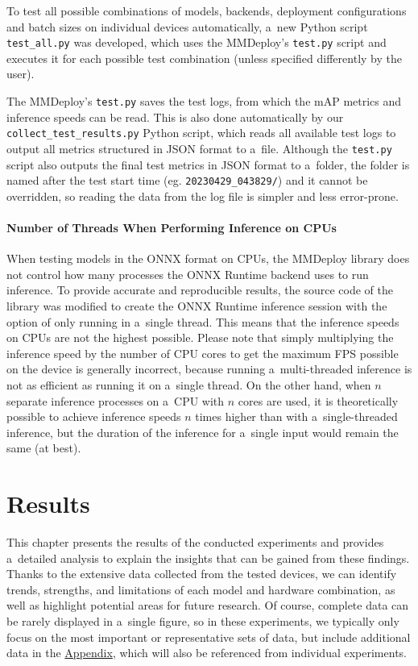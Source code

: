 To test all possible combinations of models, backends, deployment configurations
and batch sizes on individual devices automatically, a~new Python script
\texttt{test\_all.py} was developed, which uses the MMDeploy's \texttt{test.py}
script and executes it for each possible test combination (unless specified
differently by the user).

The MMDeploy's \texttt{test.py} saves the test logs, from which the mAP metrics
and inference speeds can be read. This is also done automatically by our
\texttt{collect\_test\_results.py} Python script, which reads all available test
logs to output all metrics structured in JSON format to a~file. Although the
\texttt{test.py} script also outputs the final test metrics in JSON format to
a~folder, the folder is named after the test start time (eg.
\texttt{20230429\_043829/}) and it cannot be overridden, so reading the data from
the log file is simpler and less error-prone.


\subsubsection*{Number of Threads When Performing Inference on CPUs}

When testing models in the ONNX format on CPUs, the MMDeploy library does not
control how many processes the ONNX Runtime backend uses to run inference. To
provide accurate and reproducible results, the source code of the library was
modified to create the ONNX Runtime inference session with the option of only
running in a~single thread. This means that the inference speeds on CPUs are not
the highest possible. Please note that simply multiplying the inference speed by
the number of CPU cores to get the maximum FPS possible on the device is
generally incorrect, because running a~multi-threaded inference is not as
efficient as running it on a~single thread. On the other hand, when $n$ separate
inference processes on a~CPU with $n$ cores are used, it is theoretically
possible to achieve inference speeds $n$ times higher than with
a~single-threaded inference, but the duration of the inference for a~single
input would remain the same (at best).




\chapter{Results}
\label{Results}

This chapter presents the results of the conducted experiments and provides
a~detailed analysis to explain the insights that can be gained from these
findings. Thanks to the extensive data collected from the tested devices, we can
identify trends, strengths, and limitations of each model and hardware
combination, as well as highlight potential areas for future research. Of
course, complete data can be rarely displayed in a~single figure, so in these
experiments, we typically only focus on the most important or representative sets
of data, but include additional data in the \hyperref[Appendix]{Appendix}, which
will also be referenced from individual experiments.

